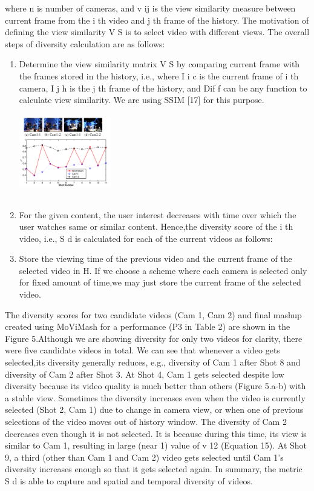 \documentclass{sig-alternate}
\begin{document}
where n is number of cameras, and v ij is the view similarity measure between current frame from the i th video and j th frame of the history. The motivation of defining the view similarity V S is to select video with different views. The overall steps of diversity calculation are as follows:
\begin{enumerate}
    \item Determine the view similarity matrix V S by comparing current frame with the frames stored in the history, i.e.,
    where I i c is the current frame of i th camera, I j h is the j th frame of the history, and Dif f can be any function to calculate view similarity. We are using SSIM [17] for this purpose.
    \includegraphics[width=4cm, height=4cm]{img5.png}
    \item For the given content, the user interest decreases with time over which the user watches same or similar content. Hence,the diversity score of the i th video, i.e., S d is calculated for each of the current videos as follows:
    \item Store the viewing time of the previous video and the current frame of the selected video in H. If we choose a scheme where each camera is selected only for fixed amount of time,we may just store the current frame of the selected video.
\end{enumerate}
The diversity scores for two candidate videos (Cam 1, Cam 2) and final mashup created using MoViMash for a performance (P3 in Table 2) are shown in the Figure 5.Although we are showing diversity for only two videos for clarity, there were five candidate videos in total. We can see that whenever a video gets selected,its diversity generally reduces, e.g., diversity of Cam 1 after Shot 8 and diversity of Cam 2 after Shot 3. At Shot 4, Cam 1 gets selected despite low diversity because its video quality is much better than others (Figure 5.a-b) with a stable view. Sometimes the diversity increases even when the video is currently selected (Shot 2, Cam 1) due to change in camera view, or when one of previous selections of the video moves out of history window. The diversity of Cam 2 decreases even though it is not selected. It is because during this time, its view is similar to Cam 1, resulting in large (near 1) value of v 12 (Equation 15). At Shot 9, a third (other than Cam 1 and Cam 2) video gets selected until Cam 1’s diversity increases enough so that it gets selected again. In summary, the metric S d is able to capture and spatial and temporal diversity of videos.
\end{document}
